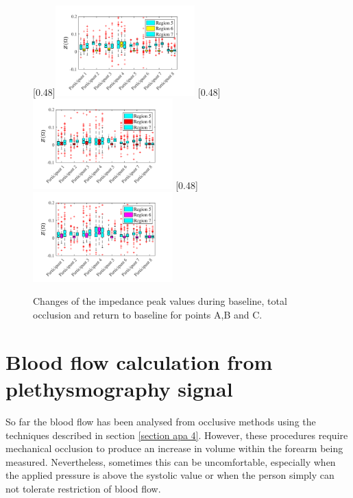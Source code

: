 \begin{figure}
	\null\hfill%
	[0.48\textwidth]{\includegraphics[width=0.48\textwidth, trim={0.5cm 0cm 1.5cm 0 cm}, clip]{figure_apa_7a}}%
	\hfill%
	[0.48\textwidth]{\includegraphics[width=0.48\textwidth, trim={0.5cm 0cm 1.5cm 0 cm}, clip]{figure_apa_7b}}%
	\hfill%
	[0.48\textwidth]{\includegraphics[width=0.48\textwidth, trim={0.5cm 0cm 1.5cm 0 cm}, clip]{figure_apa_7c}}%
	\null%
	\caption{Changes of the impedance peak values during baseline, total occlusion and return to baseline for points A,B and C.}
	\label{fig:iPG_change_points_total}
\end{figure}

\section{Blood flow calculation from plethysmography signal}
\label{section apa 5}
So far the blood flow has been analysed from occlusive methods using the techniques described in section \ref{section apa 4}. However, these procedures require mechanical occlusion to produce an increase in volume within the forearm being measured. Nevertheless, sometimes this can be uncomfortable, especially when the applied pressure is above the systolic value or when the person simply can not tolerate restriction of blood flow.

